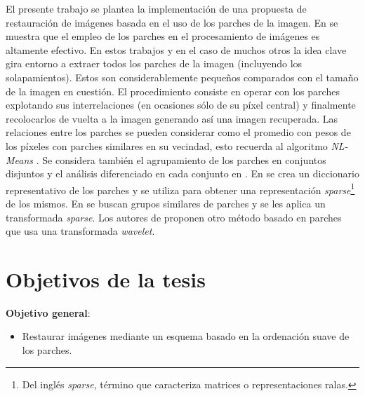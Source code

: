 \begin{introduction}
El presente trabajo se plantea la implementaci\'on de una propuesta de restauraci\'on de im\'agenes basada en el uso de los parches de la imagen. En \cite{buades2005review,chatterjee2009clustering,yu2010image,yu2011solving,dong2011image,dong2011sparsity,zoran2011learning,elad2006image,mairal2007sparse,mairal2009non,zeyde2010single,dabov2007image,li2008patch} se muestra que el empleo de los parches en el procesamiento de im\'agenes es altamente efectivo. En estos trabajos y en el caso de muchos otros la idea clave gira entorno a extraer todos los parches de la imagen (incluyendo los solapamientos). Estos son considerablemente pequeños comparados con el tamaño de la imagen en cuesti\'on. El procedimiento consiste en operar con los parches explotando sus interrelaciones (en ocasiones s\'olo de su p\'ixel central) y finalmente recolocarlos de vuelta a la imagen generando as\'i una imagen recuperada. Las relaciones entre los parches se pueden considerar como el promedio con pesos de los p\'ixeles con parches similares en su vecindad, esto recuerda al algoritmo \textit{NL-Means} \cite{buades2005review}. Se considera tambi\'en el agrupamiento de los parches en conjuntos disjuntos y el análisis diferenciado en cada conjunto en \cite{chatterjee2009clustering,yu2010image,yu2011solving,dong2011image,dong2011sparsity,zoran2011learning}. En \cite{elad2006image,mairal2007sparse,mairal2009non,zeyde2010single} se crea un diccionario representativo de los parches y se utiliza para obtener una representaci\'on \textit{sparse}\footnote{Del ingl\'es \textit{sparse}, término que caracteriza matrices o representaciones ralas.} de los mismos. En \cite{mairal2009non,dabov2007image,li2008patch} se buscan grupos similares de parches y se les aplica un transformada \textit{sparse}. Los autores de \cite{ram2011generalized,ram2012redundant} proponen otro m\'etodo basado en parches que usa una transformada \textit{wavelet}.

\section*{Objetivos de la tesis}

\qquad

\textbf{Objetivo general}: \begin{itemize}
\item Restaurar im\'agenes mediante un esquema basado en la ordenaci\'on suave de los parches.
\end{itemize}


\end{introduction}
